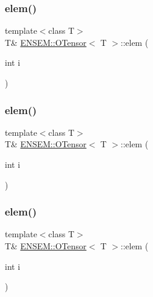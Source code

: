 \subsubsection{\texorpdfstring{elem()}{elem()}\hspace{0.1cm}{\footnotesize\ttfamily [1/6]}}
{\footnotesize\ttfamily template$<$class T$>$ \\
T\& \mbox{\hyperlink{classENSEM_1_1OTensor}{E\+N\+S\+E\+M\+::\+O\+Tensor}}$<$ T $>$\+::elem (\begin{DoxyParamCaption}\item[{int}]{i }\end{DoxyParamCaption})\hspace{0.3cm}{\ttfamily [inline]}}

\mbox{\label{classENSEM_1_1OTensor_a18a4095f1e99228c27768fbea8eec05d}} 
\subsubsection{\texorpdfstring{elem()}{elem()}\hspace{0.1cm}{\footnotesize\ttfamily [2/6]}}
{\footnotesize\ttfamily template$<$class T$>$ \\
T\& \mbox{\hyperlink{classENSEM_1_1OTensor}{E\+N\+S\+E\+M\+::\+O\+Tensor}}$<$ T $>$\+::elem (\begin{DoxyParamCaption}\item[{int}]{i }\end{DoxyParamCaption})\hspace{0.3cm}{\ttfamily [inline]}}

\mbox{\label{classENSEM_1_1OTensor_a18a4095f1e99228c27768fbea8eec05d}} 
\subsubsection{\texorpdfstring{elem()}{elem()}\hspace{0.1cm}{\footnotesize\ttfamily [3/6]}}
{\footnotesize\ttfamily template$<$class T$>$ \\
T\& \mbox{\hyperlink{classENSEM_1_1OTensor}{E\+N\+S\+E\+M\+::\+O\+Tensor}}$<$ T $>$\+::elem (\begin{DoxyParamCaption}\item[{int}]{i }\end{DoxyParamCaption})\hspace{0.3cm}{\ttfamily [inline]}}

